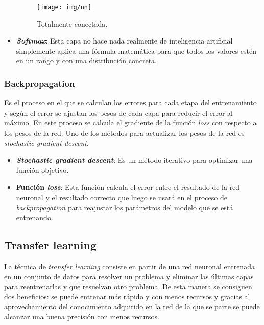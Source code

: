 \documentclass[12pt,a4paper]{article}
\begin{document}
\begin{itemize}
\begin{figure}[H]
\centering
\texttt{[image: img/nn]}
\caption{Totalmente conectada.}
\end{figure}

\item \textbf{\textit{Softmax}}: Esta capa no hace nada realmente de inteligencia artificial simplemente aplica una fórmula matemática para que todos los valores estén en un rango y con una distribución concreta.

\end{itemize}

\subsubsection{Backpropagation}
Es el proceso \cite{wiki:back} en el que se calculan los errores para cada etapa del entrenamiento y según el error se ajustan los pesos de cada capa para reducir el error al máximo. En este proceso se calcula el gradiente de la función \textit{loss} con respecto a los pesos de la red. Uno de los métodos para actualizar los pesos de la red es \textit{stochastic gradient descent}.

\begin{itemize}
\item \textbf{\textit{Stochastic gradient descent}}: Es un método iterativo para optimizar una función objetivo.

\item \textbf{Función \textit{loss}}: Esta función calcula el error entre el resultado de la red neuronal y el resultado correcto que luego se usará en el proceso de \textit{backpropagation} para reajustar los parámetros del modelo que se está entrenando.

\end{itemize}

\subsection{Transfer learning}
La técnica de \textit{transfer learning} \cite{wiki:tl} consiste en partir de una red neuronal entrenada en un conjunto de datos para resolver un problema y eliminar las últimas capas para reentrenarlas y que resuelvan otro problema. De esta manera se consiguen dos beneficios: se puede entrenar más rápido y con menos recursos y gracias al aprovechamiento del conocimiento adquirido en la red de la que se parte se puede alcanzar una buena precisión con menos recursos.
\end{document}
